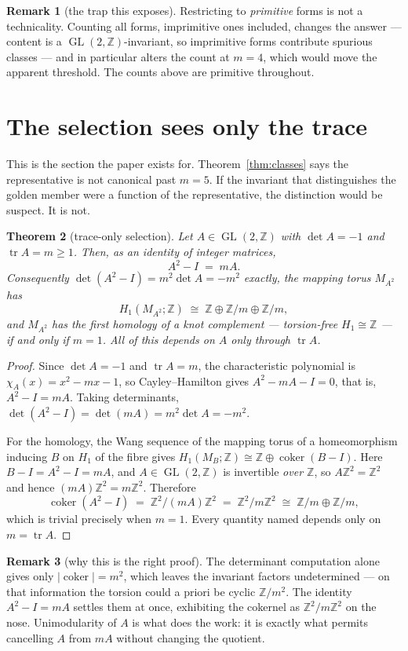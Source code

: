 \documentclass[11pt,a4paper]{article}
\newtheorem{theorem}{Theorem}[section]
\theoremstyle{definition}
\newtheorem{remark}[theorem]{Remark}
\theoremstyle{remark}
\newcommand{\GL}{\operatorname{GL}}
\newcommand{\Z}{\mathbb{Z}}
\newcommand{\tr}{\operatorname{tr}}
\begin{document}
\begin{remark}[the trap this exposes]
Restricting to \emph{primitive} forms is not a technicality. Counting all forms, imprimitive
ones included, changes the answer --- content is a $\GL(2,\Z)$-invariant, so imprimitive forms
contribute spurious classes --- and in particular alters the count at $m=4$, which would move
the apparent threshold. The counts above are primitive throughout.
\end{remark}

\section{The selection sees only the trace}\label{sec:traceonly}

This is the section the paper exists for. Theorem~\ref{thm:classes} says the representative is
not canonical past $m=5$. If the invariant that distinguishes the golden member were a function
of the representative, the distinction would be suspect. It is not.

\begin{theorem}[trace-only selection]\label{thm:traceonly}
Let $A\in\GL(2,\Z)$ with $\det A=-1$ and $\tr A=m\ge1$. Then, as an identity of integer
matrices,
\[
   A^2-I\;=\;mA .
\]
Consequently $\det(A^2-I)=m^2\det A=-m^2$ exactly, the mapping torus $M_{A^2}$ has
\[
   H_1(M_{A^2};\Z)\;\cong\;\Z\oplus\Z/m\oplus\Z/m ,
\]
and $M_{A^2}$ has the first homology of a knot complement --- torsion-free $H_1\cong\Z$ ---
if and only if $m=1$. All of this depends on $A$ only through $\tr A$.
\end{theorem}

\begin{proof}
Since $\det A=-1$ and $\tr A=m$, the characteristic polynomial is $\chi_A(x)=x^2-mx-1$, so
Cayley--Hamilton gives $A^2-mA-I=0$, that is, $A^2-I=mA$. Taking determinants,
$\det(A^2-I)=\det(mA)=m^2\det A=-m^2$.

For the homology, the Wang sequence of the mapping torus of a homeomorphism inducing $B$ on
$H_1$ of the fibre gives $H_1(M_B;\Z)\cong\Z\oplus\operatorname{coker}(B-I)$. Here
$B-I=A^2-I=mA$, and $A\in\GL(2,\Z)$ is invertible \emph{over $\Z$}, so $A\Z^2=\Z^2$ and hence
$(mA)\Z^2=m\Z^2$. Therefore
\[
   \operatorname{coker}(A^2-I)\;=\;\Z^2/(mA)\Z^2\;=\;\Z^2/m\Z^2\;\cong\;\Z/m\oplus\Z/m ,
\]
which is trivial precisely when $m=1$. Every quantity named depends only on $m=\tr A$.
\end{proof}

\begin{remark}[why this is the right proof]
The determinant computation alone gives only $|\operatorname{coker}|=m^2$, which leaves the
invariant factors undetermined --- on that information the torsion could a priori be cyclic
$\Z/m^2$. The identity $A^2-I=mA$ settles them at once, exhibiting the cokernel as $\Z^2/m\Z^2$
on the nose. Unimodularity of $A$ is what does the work: it is exactly what permits cancelling
$A$ from $mA$ without changing the quotient.
\end{remark}
\end{document}
